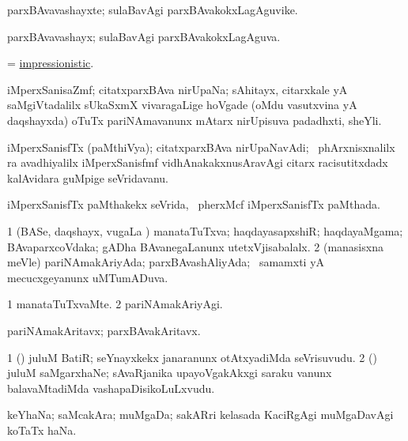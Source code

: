 \bentry
{}
\gl{\nA}
\bmng
parxBAvavashayxte; sulaBavAgi parxBAvakokxLagAguvike. 
\emng
\eentry

\bentry
{}
\gl{\gu}
\bmng
parxBAvavashayx; sulaBavAgi parxBAvakokxLagAguva. 
\emng
\eentry

\bentry
{}
\gl{\gu}
\bmng
 = \hyperlink{impressionistic}{impressionistic}. 
\emng
\eentry

\bentry
{}
\gl{\nA}
\bmng
iMperxSanisaZmf; citatxparxBAva nirUpaNa; sAhitayx, citarxkale yA saMgiVtadalilx sUkaSxmX vivaragaLige hoVgade (oMdu vasutxvina yA daqshayxda) oTuTx pariNAmavanunx mAtarx nirUpisuva padadhxti, sheYli. 
\emng
\eentry

\bentry
{}
\gl{\nA}
\bmng
iMperxSanisfTx (paMthiVya); citatxparxBAva nirUpaNavAdi; \kanmu\ phArxnisxnalilx ra avadhiyalilx iMperxSanisfmf vidhAnakakxnusAravAgi citarx racisutitxdadx kalAvidara guMpige seVridavanu. 
\emng
\eentry

\bentry
{}
\gl{\gu}
\bmng
iMperxSanisfTx paMthakekx seVrida, \kanmu\ pherxMcf iMperxSanisfTx paMthada. 
\emng
\eentry

\bentry
{}
\gl{\gu}
\bmng
\bnum
\num{1} (BASe, daqshayx, \mo vugaLa \vi) manataTuTxva; haqdayasapxshiR; haqdayaMgama; BAvaparxcoVdaka; gADha BAvanegaLanunx utetxVjisabalalx. 
\num{2} (manasisxna meVle) pariNAmakAriyAda; parxBAvashAliyAda; \kanmu\ samamxti yA mecucxgeyanunx uMTumADuva. 
\enum
\emng
\eentry

\bentry
{}
\gl{\kirxvi}
\bmng
\bnum
\num{1} manataTuTxvaMte. 
\num{2} pariNAmakAriyAgi. 
\enum
\emng
\eentry

\bentry
{}
\gl{\nA}
\bmng
pariNAmakAritavx; parxBAvakAritavx. 
\emng
\eentry

\bentry
{}
\gl{\nA}
\bmng
\bnum
\num{1} (\ca) juluM BatiR; seYnayxkekx janaranunx otAtxyadiMda seVrisuvudu. 
\num{2} (\ca) juluM saMgarxhaNe; sAvaRjanika upayoVgakAkxgi saraku \mo vanunx balavaMtadiMda vashapaDisikoLuLxvudu. 
\enum
\emng
\eentry

\bentry
{}
\gl{\nA}
\bmng
keYhaNa; saMcakAra; muMgaDa; sakARri kelasada KaciRgAgi muMgaDavAgi koTaTx haNa. 
\emng
\eentry

